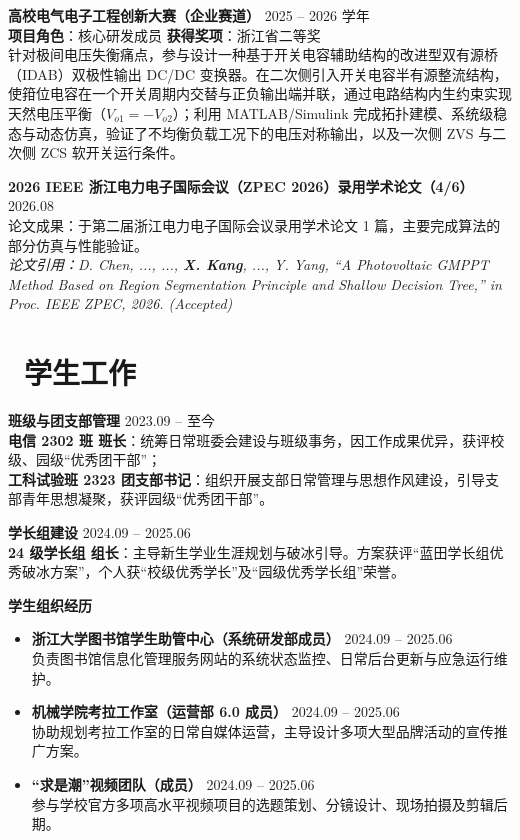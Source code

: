 \documentclass[11pt]{article}
\newlength{\interProjectSpacing}
\newcommand{\projectsep}{\vspace{\interProjectSpacing}}
\begin{document}
\projectsep

\textbf{高校电气电子工程创新大赛（企业赛道）} \hfill 2025 -- 2026 学年 \\
\textbf{项目角色}：核心研发成员 \hfill \textbf{获得奖项}：浙江省二等奖 \\
针对极间电压失衡痛点，参与设计一种基于开关电容辅助结构的改进型双有源桥（IDAB）双极性输出 DC/DC 变换器。在二次侧引入开关电容半有源整流结构，使箝位电容在一个开关周期内交替与正负输出端并联，通过电路结构内生约束实现天然电压平衡（$V_{o1} = -V_{o2}$）；利用 MATLAB/Simulink 完成拓扑建模、系统级稳态与动态仿真，验证了不均衡负载工况下的电压对称输出，以及一次侧 ZVS 与二次侧 ZCS 软开关运行条件。

\projectsep

\textbf{2026 IEEE 浙江电力电子国际会议（ZPEC 2026）录用学术论文（4/6）} \hfill 2026.08 \\
论文成果：于第二届浙江电力电子国际会议录用学术论文 1 篇，主要完成算法的部分仿真与性能验证。\\
\textit{论文引用：D. Chen, ..., ..., \textbf{X. Kang}, ..., Y. Yang, ``A Photovoltaic GMPPT Method Based on Region Segmentation Principle and Shallow Decision Tree,'' in Proc. IEEE ZPEC, 2026. (Accepted)}


\section{\makebox[\widthof{\faUsers}][c]{\color{CVBlue}\faUsers}\ 学生工作}

\textbf{班级与团支部管理} \hfill 2023.09 -- 至今 \\
\textbf{电信 2302 班 班长}：统筹日常班委会建设与班级事务，因工作成果优异，获评校级、园级“优秀团干部”； \\
\textbf{工科试验班 2323 团支部书记}：组织开展支部日常管理与思想作风建设，引导支部青年思想凝聚，获评园级“优秀团干部”。

\projectsep

\textbf{学长组建设} \hfill 2024.09 -- 2025.06 \\
\textbf{24 级学长组 组长}：主导新生学业生涯规划与破冰引导。方案获评“蓝田学长组优秀破冰方案”，个人获“校级优秀学长”及“园级优秀学长组”荣誉。

\projectsep

\textbf{学生组织经历} 
\vspace{-0.4em} %
\begin{itemize}[nosep, topsep=0em]
    \item \textbf{浙江大学图书馆学生助管中心（系统研发部成员）} \hfill 2024.09 -- 2025.06 \\
    负责图书馆信息化管理服务网站的系统状态监控、日常后台更新与应急运行维护。
    \item \textbf{机械学院考拉工作室（运营部 6.0 成员）} \hfill 2024.09 -- 2025.06 \\
    协助规划考拉工作室的日常自媒体运营，主导设计多项大型品牌活动的宣传推广方案。
    \item \textbf{“求是潮”视频团队（成员）} \hfill 2024.09 -- 2025.06 \\
    参与学校官方多项高水平视频项目的选题策划、分镜设计、现场拍摄及剪辑后期。
\end{itemize}
\end{document}
